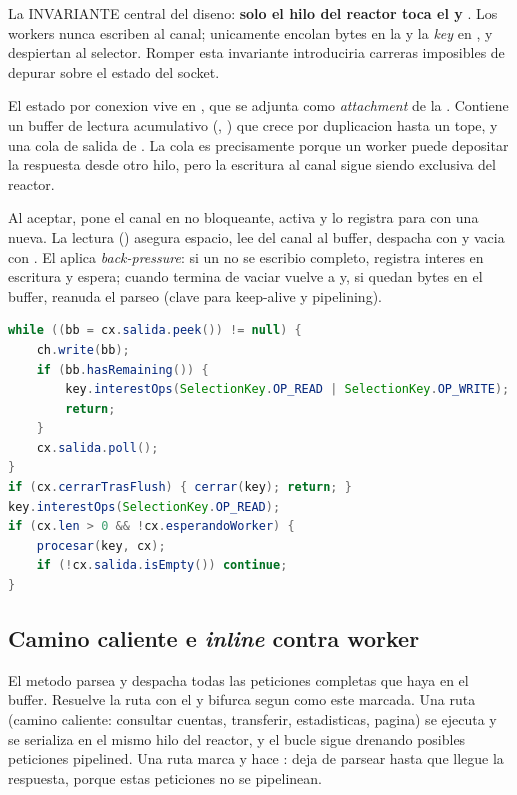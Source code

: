 \begin{advertencia}
La INVARIANTE central del diseno: \textbf{solo el hilo del reactor toca el
 y }. Los workers nunca escriben
al canal; unicamente encolan bytes en la  y la \emph{key} en
, y despiertan al selector. Romper esta invariante
introduciria carreras imposibles de depurar sobre el estado del socket.
\end{advertencia}

El estado por conexion vive en , que se adjunta
como \emph{attachment} de la . Contiene un buffer de lectura
acumulativo (, ) que crece por duplicacion hasta un tope,
y una cola de salida  de . La cola es
 precisamente porque un worker puede depositar la
respuesta desde otro hilo, pero la escritura al canal sigue siendo exclusiva del
reactor.

Al aceptar,  pone el canal en no bloqueante, activa
 y lo registra para  con una
 nueva. La lectura () asegura espacio, lee del
canal al buffer, despacha con  y vacia con . El
 aplica \emph{back-pressure}: si un  no se
escribio completo, registra interes en escritura y espera; cuando termina de
vaciar vuelve a  y, si quedan bytes en el buffer, reanuda el
parseo (clave para keep-alive y pipelining).

\begin{lstlisting}[language=Java,caption={flush con back-pressure y reanudacion del parseo}]
while ((bb = cx.salida.peek()) != null) {
    ch.write(bb);
    if (bb.hasRemaining()) {
        key.interestOps(SelectionKey.OP_READ | SelectionKey.OP_WRITE);
        return;
    }
    cx.salida.poll();
}
if (cx.cerrarTrasFlush) { cerrar(key); return; }
key.interestOps(SelectionKey.OP_READ);
if (cx.len > 0 && !cx.esperandoWorker) {
    procesar(key, cx);
    if (!cx.salida.isEmpty()) continue;
}
\end{lstlisting}

\subsection{Camino caliente e \emph{inline} contra worker}

El metodo  parsea y despacha todas las peticiones completas
que haya en el buffer. Resuelve la ruta con el  y bifurca segun
como este marcada. Una ruta  (camino caliente: consultar cuentas,
transferir, estadisticas, pagina) se ejecuta y se serializa en el mismo hilo del
reactor, y el bucle sigue drenando posibles peticiones pipelined. Una ruta
 marca  y hace : deja de
parsear hasta que llegue la respuesta, porque estas peticiones no se pipelinean.

